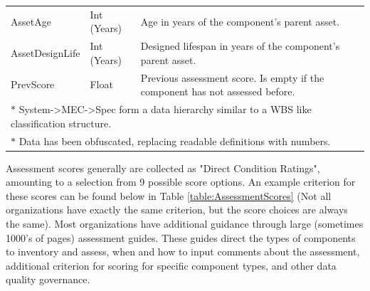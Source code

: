 \documentclass[Journal,letterpaper,NoPageNumbers,NoLineNumbers]{ascelike-new}
\begin{document}
\begin{table}
\begin{tabular}{l l p{3.2in}}
AssetAge & Int (Years) & Age in years of the component's parent asset. \\
AssetDesignLife & Int (Years) & Designed lifespan in years of the component's parent asset. \\
PrevScore & Float & Previous assessment score. Is empty if the component has not assessed before. \\
\hline
\multicolumn{3}{l}{$\ast$ System->MEC->Spec form a data hierarchy similar to a WBS like classification structure.} \\
\multicolumn{3}{l}{$\ast$ Data has been obfuscated, replacing readable definitions with numbers.} \\
\hline\hline
\end{tabular}
\normalsize
\end{table}

Assessment scores generally are collected as "Direct Condition Ratings", amounting to a selection from 9 possible score options. An example criterion for these scores can be found below in Table \ref{table:AssessmentScores} (Not all organizations have exactly the same criterion, but the score choices are always the same). Most organizations have additional guidance through large (sometimes 1000's of pages) assessment guides. These guides direct the types of components to inventory and assess, when and how to input comments about the assessment, additional criterion for scoring for specific component types, and other data quality governance. 
\end{document}
